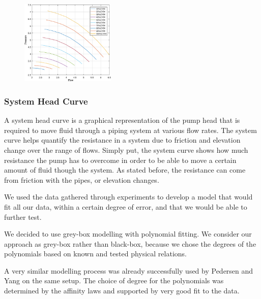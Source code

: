 \begin{figure}[H]
	\centering
	\includegraphics[width=0.4\textwidth]{figures/05mathematicalModeling/pumpCurves.eps}
\end{figure}

\newpage
\subsubsection{System Head Curve}
A system head curve is a graphical representation of the pump head that is required to move fluid through a piping system at various flow rates.
The system curve helps quantify the resistance in a system due to friction and elevation change over the range of flows. Simply put, the 
system curve shows how much resistance the pump has to overcome in order to be able to move a certain amount of fluid though the system.
As stated before, the resistance can come from friction with the pipes, or elevation changes.


We used the data gathered through experiments to develop a model that would fit all our data, within a certain degree of error, 
and that we would be able to further test.

We decided to use grey-box modelling with polynomial fitting.
We consider our approach as grey-box rather than black-box,
because we chose the degrees of the polynomials based on known and tested physical relations.

A very similar modelling process was already successfully used by Pedersen and Yang \cite{YangMultiPump2008} on the same setup.
The choice of degree for the polynomials was determined by the affinity laws \cite{AffinityLaws}
and supported by very good fit to the data.

